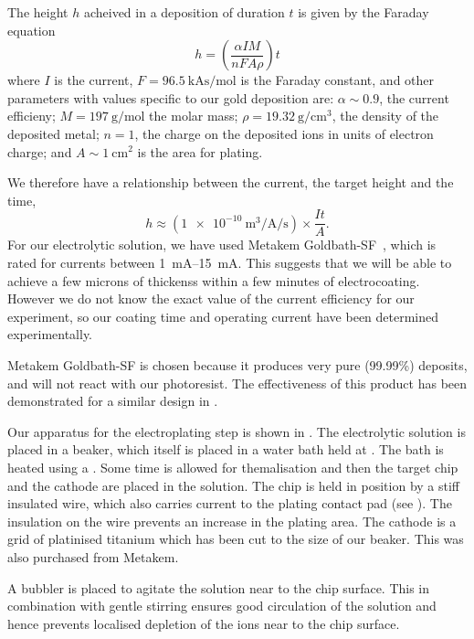 The height $h$ acheived in a deposition of duration $t$ is given by the Faraday
equation~\cite{Ruythooren_2000}
%
\begin{equation}
  h = \left(\frac{\alpha I M}{nFA\rho}\right)t
\end{equation}
%
where $I$ is the current, $F=\SI{96.5}{\kilo\ampere\second\per\mole}$ is the
Faraday constant, and other parameters with values specific to our gold
deposition are: $\alpha\sim0.9$, the current efficieny; $M =
\SI{197}{\gram\per\mole}$ the molar mass;
$\rho=\SI{19.32}{\gram\per\centi\meter\cubed}$, the density of the deposited
metal; $n=1$, the charge on the deposited ions in units of electron charge; and
$A\sim\SI{1}{\centi\meter\squared}$ is the area for plating.

We therefore have a relationship between the current, the target height and the
time,
%
\begin{equation}
  h \approx \left(
  \SI[per-mode=fraction]{1e-10}{\meter\cubed\per\ampere\per\second} \right)
  \times\frac{It}{A}.
\end{equation}
%
For our electrolytic solution, we have used Metakem Goldbath-SF~\cite{}, which
is rated for currents between \SIrange{1}{15}{\milli\ampere}. This suggests
that we will be able to achieve a few microns of thickenss within a few minutes
of electrocoating. However we do not know the exact value of the current
efficiency for our experiment, so our coating time and operating current have
been determined experimentally.

Metakem Goldbath-SF is chosen because it produces very pure (99.99\%) deposits,
and will not react with our photoresist. The effectiveness of this product has
been demonstrated for a similar design in .

Our apparatus for the electroplating step is shown in
. The electrolytic solution is placed in a
beaker, which itself is placed in a water bath held at . The bath is
heated using a . Some time is allowed for themalisation
and then the target chip and the cathode are placed in the solution. The chip
is held in position by a stiff insulated wire, which also carries current to
the plating contact pad (see ). The insulation on
the wire prevents an increase in the plating area. The cathode is a grid of
platinised titanium which has been cut to the size of our beaker. This was also
purchased from Metakem.

A bubbler is placed to agitate the solution near to the chip surface. This in
combination with gentle stirring ensures good circulation of the solution and
hence prevents localised depletion of the ions near to the chip
surface.~\cite{Schlesinger2011} 

